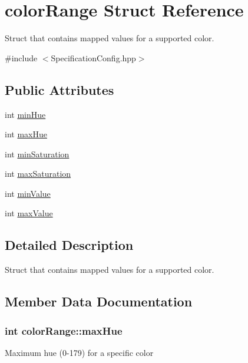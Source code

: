 \hypertarget{structcolorRange}{}\section{color\+Range Struct Reference}
\label{structcolorRange}


Struct that contains mapped values for a supported color.  




{\ttfamily \#include $<$Specification\+Config.\+hpp$>$}

\subsection*{Public Attributes}
\begin{DoxyCompactItemize}
\item 
int \hyperlink{structcolorRange_a9679488c6339699971dd203817216c0c}{min\+Hue}
\item 
int \hyperlink{structcolorRange_a08f7a79d3fe6da4ce3dd62ac710cb8b9}{max\+Hue}
\item 
int \hyperlink{structcolorRange_a98acafa32db912103eeb515b6f8308a0}{min\+Saturation}
\item 
int \hyperlink{structcolorRange_abf29d6b695efd30da709e39b4c94b638}{max\+Saturation}
\item 
int \hyperlink{structcolorRange_a51150443fec527eab104fc39d6811bd8}{min\+Value}
\item 
int \hyperlink{structcolorRange_a1653821b47f0de18315b0d7f3bc54c13}{max\+Value}
\end{DoxyCompactItemize}


\subsection{Detailed Description}
Struct that contains mapped values for a supported color. 

\subsection{Member Data Documentation}
\subsubsection[{\texorpdfstring{max\+Hue}{maxHue}}]{\setlength{\rightskip}{0pt plus 5cm}int color\+Range\+::max\+Hue}\hypertarget{structcolorRange_a08f7a79d3fe6da4ce3dd62ac710cb8b9}{}\label{structcolorRange_a08f7a79d3fe6da4ce3dd62ac710cb8b9}
Maximum hue (0-\/179) for a specific color 
